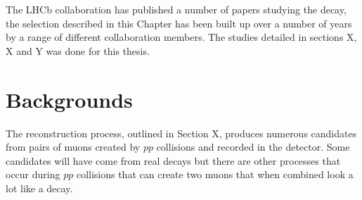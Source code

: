 The LHCb collaboration has published a number of papers studying the \bsmumu decay, the selection described in this Chapter has been built up over a number of years by a range of different collaboration members. The studies detailed in sections X, X and Y was done for this thesis.





\section{Backgrounds}
\label{sec:backgroundoutline}


The reconstruction process, outlined in Section X, produces numerous \bsmumu candidates from pairs of muons created by $pp$ collisions and recorded in the detector. Some candidates will have come from real \bsmumu decays but there are other processes that occur during $pp$ collisions that can create two muons that when combined look a lot like a \bsmumu decay. %

